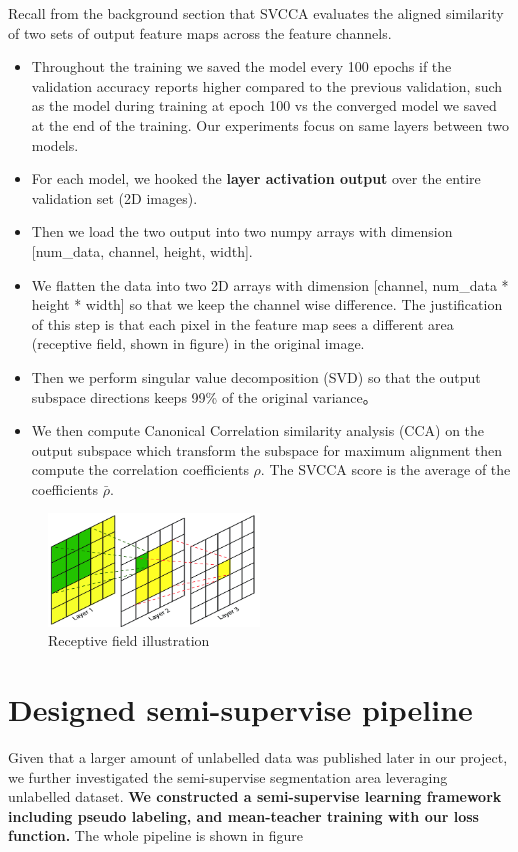 Recall from the background section that SVCCA evaluates the aligned similarity of two sets of output feature maps across the feature channels.\\
\begin{itemize}
	\item Throughout the training we saved the model every 100 epochs if the validation accuracy reports higher compared to the previous validation, such as the model during training at epoch 100 vs the converged model we saved at the end of the training.  Our experiments focus on same layers between two models.
	\item For each model, we hooked the \textbf{layer activation output} over the entire validation set (2D images).
	\item Then we load the two output into two numpy arrays with dimension [num\_data, channel, height, width]. 
	\item We flatten the data into two 2D arrays with dimension [channel, num\_data * height * width] so that we keep the channel wise difference. The justification of this step is that each pixel in the feature map  sees a different area (receptive field, shown in figure) in the original image.
	\item Then we perform singular value decomposition (SVD) so that the output subspace directions keeps 99\% of the original variance。
	\item We then compute Canonical Correlation similarity analysis (CCA) on the output subspace which transform the subspace for maximum alignment then compute the correlation coefficients $\rho$. The SVCCA score is the average of the coefficients $\bar {\rho}$.
\end{itemize}
 
\begin{figure}
	\centering
	\includegraphics[width=0.5\textwidth]{img/Net_arch/receptive_field}
	\caption{Receptive field illustration}
\end{figure}

\section{Designed semi-supervise pipeline}
Given that a larger amount of unlabelled data was published later in our project, we further investigated the semi-supervise segmentation area leveraging unlabelled dataset. \textbf{We constructed a semi-supervise learning framework including pseudo labeling, and mean-teacher training with our loss function.} The whole pipeline is shown in figure 

